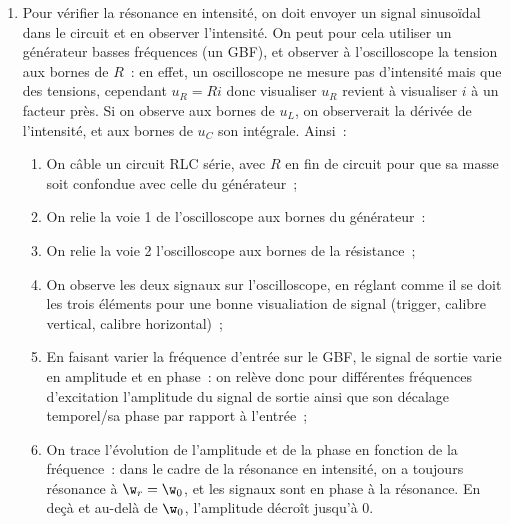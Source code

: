 \documentclass[a4paper, 11pt, final, garamond]{book}
\begin{document}
\begin{enumerate}[label=\sqenumi]
    \item Pour vérifier la résonance en intensité, on doit envoyer un signal
        sinusoïdal dans le circuit et en observer l'intensité. On peut pour cela
        utiliser un générateur basses fréquences (un GBF), et observer à
        l'oscilloscope la tension aux bornes de $R$~: en effet, un oscilloscope
        ne mesure pas d'intensité mais que des tensions, cependant $u_R = Ri$
        donc visualiser $u_R$ revient à visualiser $i$ à un facteur près. Si on
        observe aux bornes de $u_L$, on observerait la dérivée de l'intensité,
        et aux bornes de $u_C$ son intégrale. Ainsi~:
        \begin{enumerate}
            \item On câble un circuit RLC série, avec $R$ en fin de circuit pour
                que sa masse soit confondue avec celle du générateur~;
            \item On relie la voie 1 de l'oscilloscope aux bornes du
                générateur~:
            \item On relie la voie 2 l'oscilloscope aux bornes de la
                résistance~;
            \item On observe les deux signaux sur l'oscilloscope, en réglant
                comme il se doit les trois éléments pour une bonne visualiation
                de signal (trigger, calibre vertical, calibre horizontal)~;
            \item En faisant varier la fréquence d'entrée sur le GBF, le signal
                de sortie varie en amplitude et en phase~: on relève donc pour
                différentes fréquences d'excitation l'amplitude du signal de
                sortie ainsi que son décalage temporel/sa phase par rapport à
                l'entrée~;
            \item On trace l'évolution de l'amplitude et de la phase en fonction
                de la fréquence~: dans le cadre de la résonance en intensité, on
                a toujours résonance à $\w_r = \w_0$, et les signaux sont en
                phase à la résonance. En deçà et au-delà de $\w_0$, l'amplitude
                décroît jusqu'à 0.
        \end{enumerate}


\end{enumerate}
\end{document}
